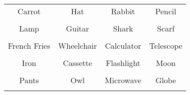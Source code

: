 \documentclass[12pt,a4paper]{article}
\begin{document}
\thispagestyle{empty}
\begin{table}[]
\centering
\Huge
\begin{tabular}{cccc}
 Carrot& Hat& Rabbit& Pencil\\  & & & \\
 Lamp& Guitar& Shark& Scarf\\  & & & \\
 French Fries& Wheelchair& Calculator& Telescope\\  & & & \\
 Iron& Cassette& Flashlight& Moon\\  & & & \\
 Pants& Owl& Microwave& Globe\\  & & & \\
\end{tabular}
\end{table}
\end{document}
